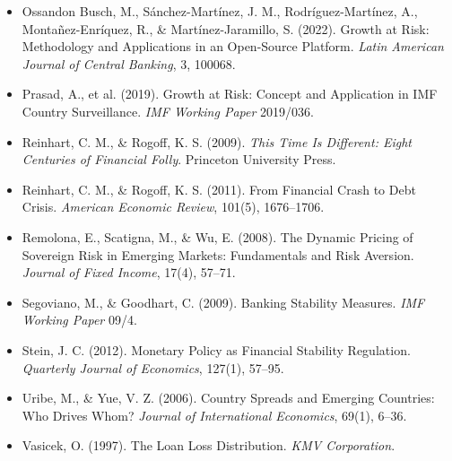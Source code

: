 \documentclass[5p,times,twocolumn,authoryear]{elsarticle}
\begin{document}
\begin{itemize}
    \item Ossandon Busch, M., Sánchez-Martínez, J. M., Rodríguez-Martínez, A., Montañez-Enríquez, R., \& Martínez-Jaramillo, S. (2022). Growth at Risk: Methodology and Applications in an Open-Source Platform. \textit{Latin American Journal of Central Banking}, 3, 100068.
    \item Prasad, A., et al. (2019). Growth at Risk: Concept and Application in IMF Country Surveillance. \textit{IMF Working Paper} 2019/036.
    \item Reinhart, C. M., \& Rogoff, K. S. (2009). \textit{This Time Is Different: Eight Centuries of Financial Folly}. Princeton University Press.
    \item Reinhart, C. M., \& Rogoff, K. S. (2011). From Financial Crash to Debt Crisis. \textit{American Economic Review}, 101(5), 1676–1706.
    \item Remolona, E., Scatigna, M., \& Wu, E. (2008). The Dynamic Pricing of Sovereign Risk in Emerging Markets: Fundamentals and Risk Aversion. \textit{Journal of Fixed Income}, 17(4), 57–71.
    \item Segoviano, M., \& Goodhart, C. (2009). Banking Stability Measures. \textit{IMF Working Paper} 09/4.
    \item Stein, J. C. (2012). Monetary Policy as Financial Stability Regulation. \textit{Quarterly Journal of Economics}, 127(1), 57–95.
    \item Uribe, M., \& Yue, V. Z. (2006). Country Spreads and Emerging Countries: Who Drives Whom? \textit{Journal of International Economics}, 69(1), 6–36.
    \item Vasicek, O. (1997). The Loan Loss Distribution. \textit{KMV Corporation}.
\end{itemize}
\end{document}
